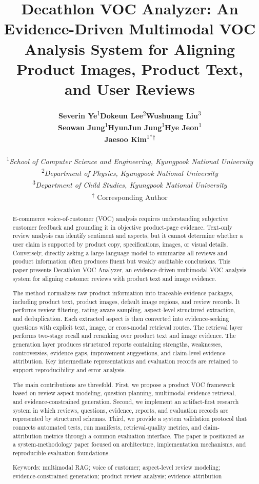 \documentclass[11pt]{article}
\title{\textbf{Decathlon VOC Analyzer: An Evidence-Driven Multimodal VOC Analysis System for Aligning Product Images, Product Text, and User Reviews}}
\author{{\small
\begin{tabular}{@{}ccc@{}}
\parbox[t]{0.3067\textwidth}{\centering \textbf{Severin Ye}\textsuperscript{1}} & \parbox[t]{0.3067\textwidth}{\centering \textbf{Dokeun Lee}\textsuperscript{2}} & \parbox[t]{0.3067\textwidth}{\centering \textbf{Wushuang Liu}\textsuperscript{3}} \\[0.9em]
\parbox[t]{0.3067\textwidth}{\centering \textbf{Seowan Jung}\textsuperscript{1}} & \parbox[t]{0.3067\textwidth}{\centering \textbf{HyunJun Jung}\textsuperscript{1}} & \parbox[t]{0.3067\textwidth}{\centering \textbf{Hye Jeon}\textsuperscript{1}} \\[0.9em]
\parbox[t]{0.3067\textwidth}{} & \parbox[t]{0.3067\textwidth}{\centering \textbf{Jaesoo Kim}\textsuperscript{1*†}} & \parbox[t]{0.3067\textwidth}{} \\
\multicolumn{3}{c}{} \\[0.45em]
\multicolumn{3}{c}{\parbox{0.9200\textwidth}{\centering\small\textsuperscript{1}\textit{School of Computer Science and Engineering, Kyungpook National University}}} \\
\multicolumn{3}{c}{\parbox{0.9200\textwidth}{\centering\small\textsuperscript{2}\textit{Department of Physics, Kyungpook National University}}} \\
\multicolumn{3}{c}{\parbox{0.9200\textwidth}{\centering\small\textsuperscript{3}\textit{Department of Child Studies, Kyungpook National University}}} \\
\multicolumn{3}{c}{\small \textsuperscript{†}  Corresponding Author} \\
\end{tabular}
}}
\date{} %
\begin{document}
\maketitle
\nocite{lewis2020retrievalAugmentedGeneration,gao2023rarr,radford2021clip,liu2024structuredOutputBenchmark,geng2023grammarConstrainedDecoding,yao2023react,nvidia2024multimodalRagIntro,nvidia2024aiReadyKnowledgeSystems,faysse2024colpali,pontiki2014semevalAspect,qdrant2024pdfRetrievalAtScale,qdrant2024multiVectorCourse,manning2008introductionIr}

\begin{abstract}
E-commerce voice-of-customer (VOC) analysis requires understanding subjective customer feedback and grounding it in objective product-page evidence. Text-only review analysis can identify sentiment and aspects, but it cannot determine whether a user claim is supported by product copy, specifications, images, or visual details. Conversely, directly asking a large language model to summarize all reviews and product information often produces fluent but weakly auditable conclusions. This paper presents Decathlon VOC Analyzer, an evidence-driven multimodal VOC analysis system for aligning customer reviews with product text and image evidence.

The method normalizes raw product information into traceable evidence packages, including product text, product images, default image regions, and review records. It performs review filtering, rating-aware sampling, aspect-level structured extraction, and deduplication. Each extracted aspect is then converted into evidence-seeking questions with explicit text, image, or cross-modal retrieval routes. The retrieval layer performs two-stage recall and reranking over product text and image evidence. The generation layer produces structured reports containing strengths, weaknesses, controversies, evidence gaps, improvement suggestions, and claim-level evidence attribution. Key intermediate representations and evaluation records are retained to support reproducibility and error analysis.

The main contributions are threefold. First, we propose a product VOC framework based on review aspect modeling, question planning, multimodal evidence retrieval, and evidence-constrained generation. Second, we implement an artifact-first research system in which reviews, questions, evidence, reports, and evaluation records are represented by structured schemas. Third, we provide a system validation protocol that connects automated tests, run manifests, retrieval-quality metrics, and claim-attribution metrics through a common evaluation interface. The paper is positioned as a system-methodology paper focused on architecture, implementation mechanisms, and reproducible evaluation foundations.

Keywords: multimodal RAG; voice of customer; aspect-level review modeling; evidence-constrained generation; product review analysis; evidence attribution
\end{abstract}
\end{document}
